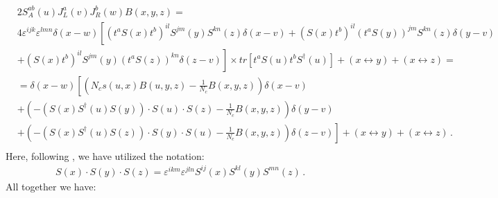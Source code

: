 \documentclass[11pt,a4paper]{article}
\begin{document}
\begin{equation}\begin{split}
&2S_{A}^{ab}(u)J_{L}^{a}(v)J_{R}^{b}(w)B(x,y,z)=\\
&4\varepsilon^{ijk}\varepsilon^{lmn}\delta(x-w)\left[(t^{a}S(x)t^{b})^{il}S^{jm}(y)S^{kn}(z)\delta(x-v)+(S(x)t^{b})^{il}(t^{a}S(y))^{jm}S^{kn}(z)\delta(y-v)\right.\\
&\left.+(S(x)t^{b})^{il}S^{jm}(y)(t^{a}S(z))^{kn}\delta(z-v)\right]\times tr\left[t^{a}S(u)t^{b}S^{\dagger}(u)\right]+\left(x\leftrightarrow y\right)+\left(x\leftrightarrow z\right)=\\
&=\delta(x-w)\left[\left(N_{c}s(u,x)B(u,y,z)-\frac{1}{N_{c}}B(x,y,z)\right)\delta(x-v)\right. \\
&\left. +\left(-(S(x)S^{\dagger}(u)S(y))\cdot S(u)\cdot S(z)-\frac{1}{N_{c}}B(x,y,z)\right)\delta(y-v)\right.\\
&\left.+\left(-(S(x)S^{\dagger}(u)S(z))\cdot S(y)\cdot S(u)-\frac{1}{N_{c}}B(x,y,z)\right)\delta(z-v)\right]+(x\leftrightarrow y)+(x\leftrightarrow z)\,.\\
\end{split}\end{equation}
Here, following \cite{Grab}, we have utilized the notation:
\begin{equation}\begin{split}
S(x)\cdot S(y)\cdot S(z)=\varepsilon^{ikm}\varepsilon^{jln}S^{ij}(x)S^{kl}(y)S^{mn}(z)\,.
 \end{split}\end{equation}
All together we have:
\end{document}
